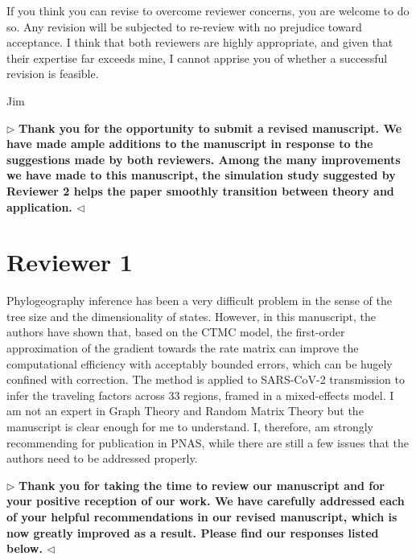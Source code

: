 \documentclass[12pt]{article}
\newenvironment{reply}{$\triangleright$\bfseries}{$\triangleleft$}
\begin{document}
If you think you can revise to overcome reviewer concerns, you are welcome to do so. Any revision will be subjected to re-review with no prejudice toward acceptance. I think that both reviewers are highly appropriate, and given that their expertise far exceeds mine, I cannot apprise you of whether a successful revision is feasible. 

Jim 

\begin{reply}
	Thank you for the opportunity to submit a revised manuscript. We have made ample additions to the manuscript in response to the suggestions made by both reviewers. Among the many improvements we have made to this manuscript, the simulation study suggested by Reviewer 2 helps the paper smoothly transition between theory and application.
\end{reply}


\section*{Reviewer 1}

Phylogeography inference has been a very difficult problem in the sense of the tree size and the dimensionality of states. However, in this manuscript, the authors have shown that, based on the CTMC model, the first-order approximation of the gradient towards the rate matrix can improve the computational efficiency with acceptably bounded errors, which can be hugely confined with correction. The method is applied to SARS-CoV-2 transmission to infer the traveling factors across 33 regions, framed in a mixed-effects model. I am not an expert in Graph Theory and Random Matrix Theory but the manuscript is clear enough for me to understand. I, therefore, am strongly recommending for publication in PNAS, while there are still a few issues that the authors need to be addressed properly.

\begin{reply}
	Thank you for taking the time to review our manuscript and for your positive reception of our work.  We have carefully addressed each of your helpful recommendations in our revised manuscript, which is now greatly improved as a result.  Please find our responses listed below.
\end{reply}
\end{document}
